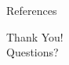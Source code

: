 \documentclass[10pt]{beamer}
\newcommand\blfootnote[1]{%
  \begingroup
  \renewcommand\thefootnote{}\footnote{#1}%
  \addtocounter{footnote}{-1}%
  \endgroup
}
\begin{document}
\begin{frame}[allowframebreaks]{References}
    \scriptsize
    
    
\end{frame}

\begin{frame}
\vfill
\begin{center}
\Large Thank You! 
\\
\large Questions?
\end{center}
\end{frame}
\end{document}
